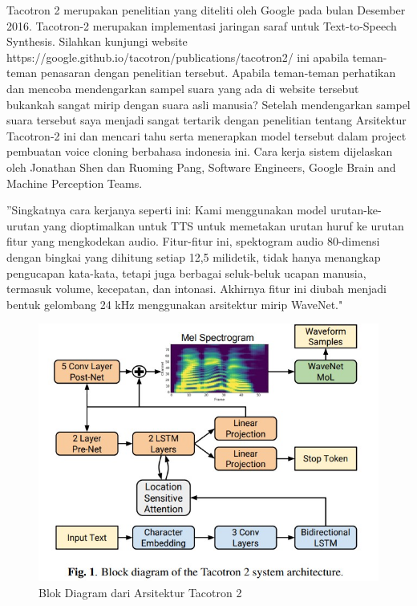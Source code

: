 Tacotron 2 merupakan penelitian yang diteliti oleh Google pada bulan Desember 2016. Tacotron-2 merupakan implementasi jaringan saraf untuk Text-to-Speech Synthesis. Silahkan kunjungi website https://google.github.io/tacotron/publications/tacotron2/ ini apabila teman-teman penasaran dengan penelitian tersebut. Apabila teman-teman perhatikan dan mencoba mendengarkan sampel suara yang ada di website tersebut bukankah sangat mirip dengan suara asli manusia? Setelah mendengarkan sampel suara tersebut saya menjadi sangat tertarik dengan penelitian tentang Arsitektur Tacotron-2 ini dan mencari tahu serta menerapkan model tersebut dalam project pembuatan voice cloning berbahasa indonesia ini. Cara kerja sistem dijelaskan oleh Jonathan Shen dan Ruoming Pang, Software Engineers, Google Brain and Machine Perception Teams.

''Singkatnya cara kerjanya seperti ini: Kami menggunakan model urutan-ke-urutan yang dioptimalkan untuk TTS untuk memetakan urutan huruf ke urutan fitur yang mengkodekan audio. Fitur-fitur ini, spektogram audio 80-dimensi dengan bingkai yang dihitung setiap 12,5 milidetik, tidak hanya menangkap pengucapan kata-kata, tetapi juga berbagai seluk-beluk ucapan manusia, termasuk volume, kecepatan, dan intonasi. Akhirnya fitur ini diubah menjadi bentuk gelombang 24 kHz menggunakan arsitektur mirip WaveNet."

\begin{figure}[H]
        \centerline{\includegraphics[scale=.5]{figures/fig1}}
        \caption{Blok Diagram dari Arsitektur Tacotron 2}
		\label{fig1}
\end{figure}

